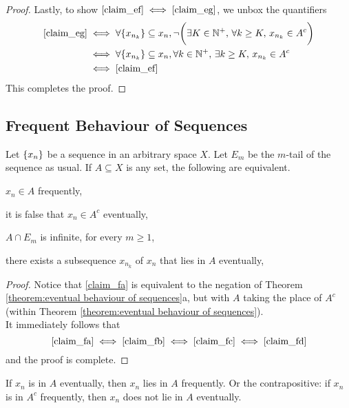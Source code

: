 \documentclass[../../main.tex]{subfiles}
\begin{document}
\begin{proof}
    Lastly, to show $\ref{claim_ef}\iff\ref{claim_eg}$, we unbox the quantifiers
    \begin{align*}
    \ref{claim_eg}&\iff \forall \{x_{n_k}\}\subseteq x_n, \neg\biggl(\exists K\in\mathbb{N}^+,\,\forall k\geq K,\, x_{n_k}\in A^c\biggr)\\
    &\iff \forall \{x_{n_k}\}\subseteq x_n,\forall k\in\mathbb{N}^+,\,\exists k\geq K,\, x_{n_k}\in A^c\\
    &\iff \ref{claim_ef}
    \end{align*}
    This completes the proof.
\end{proof}
\newpage
\subsection{Frequent Behaviour of Sequences}
\begin{wts}\label{theorem:frequent behaviour of sequences}
    Let $\{x_n\}$ be a sequence in an arbitrary space $X$. Let $E_m$ be the $m$-tail of the sequence as usual. If $A\subseteq X$ is any set, the following are equivalent.
    \begin{enumalpha}
        \item $x_n\in A$ frequently,\label{claim_fa}
        \item it is false that $x_n\in A^c$ eventually,\label{claim_fb}
        \item $A\cap E_m$ is infinite, for every $m\geq 1$,\label{claim_fc}
        \item there exists a subsequence $x_{n_k}$ of $x_n$ that lies in $A$ eventually,\label{claim_fd}
    \end{enumalpha}
\end{wts}
\begin{proof}
    Notice that \ref{claim_fa} is equivalent to the negation of Theorem \ref{theorem:eventual behaviour of sequences}a, but with $A$ taking the place of $A^c$ (within Theorem \ref{theorem:eventual behaviour of sequences}). \\
    
    It immediately follows that
    \[
    \ref{claim_fa}\iff \ref{claim_fb}\iff \ref{claim_fc}\iff \ref{claim_fd}
    \]
    and the proof is complete.
\end{proof}
\begin{corollary}
    If $x_n$ is in $A$ eventually, then $x_n$ lies in $A$ frequently. Or the contrapositive: if $x_n$ is in $A^c$ frequently, then $x_n$ does not lie in $A$ eventually.
\end{corollary}
\end{document}
